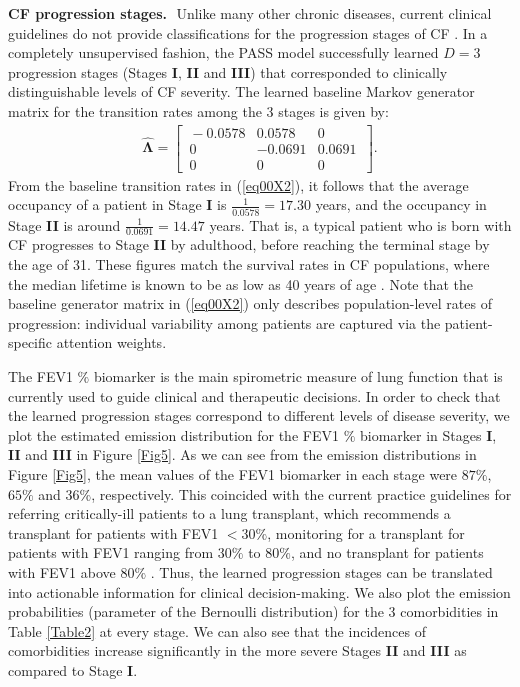 \documentclass[twoside,11pt]{article}
\begin{document}
{\bf CF progression stages.}\,\, Unlike many other chronic diseases, current clinical guidelines do not provide classifications for the progression stages of CF \cite{szczesniak2017phenotypes}. In a completely unsupervised fashion, the PASS model successfully learned \mbox{\footnotesize $D=3$} progression stages (Stages {\bf I}, {\bf II} and {\bf III}) that corresponded to clinically distinguishable levels of CF severity. The learned baseline Markov generator matrix for the transition rates among the 3 stages is given by:
\begin{align}
\boldsymbol{\hat{\Lambda}} = \begin{bmatrix}
\, -0.0578 & 0.0578 &  0  \, \\
\, 0  & -0.0691 & 0.0691 \, \\
\, 0 &  0 & 0 \,
  \end{bmatrix}. 
\label{eq00X2}
\end{align}  
From the baseline transition rates in (\ref{eq00X2}), it follows that the average occupancy of a patient in Stage {\bf I} is $\frac{1}{0.0578} = 17.30$ years, and the occupancy in Stage {\bf II} is around $\frac{1}{0.0691} = 14.47$ years. That is, a typical patient who is born with CF progresses to Stage {\bf II} by adulthood, before reaching the terminal stage by the age of 31. These figures match the survival rates in CF populations, where the median lifetime is known to be as low as 40 years of age \cite{mccarthy2013cf}. Note that the baseline generator matrix in (\ref{eq00X2}) only describes population-level rates of progression: individual variability among patients are captured via the patient-specific attention weights.  

The FEV1 $\%$ biomarker is the main spirometric measure of lung function that is currently used to guide clinical and therapeutic decisions. In order to check that the learned progression stages correspond to different levels of disease severity, we plot the estimated emission distribution for the FEV1 $\%$ biomarker in Stages {\bf I}, {\bf II} and {\bf III} in Figure \ref{Fig5}. As we can see from the emission distributions in Figure \ref{Fig5}, the mean values of the FEV1 biomarker in each stage were $87\%$, $65\%$ and $36\%$, respectively. This coincided with the current practice guidelines for referring critically-ill patients to a lung transplant, which recommends a transplant for patients with FEV1 $< 30\%$, monitoring for a transplant for patients with FEV1 ranging from $30\%$ to $80\%$, and no transplant for patients with FEV1 above $80\%$ \cite{braun2011cystic}. Thus, the learned progression stages can be translated into actionable information for clinical decision-making. We also plot the emission probabilities (parameter of the Bernoulli distribution) for the 3 comorbidities in Table \ref{Table2} at every stage. We can also see that the incidences of comorbidities increase significantly in the more severe Stages {\bf II} and {\bf III} as compared to Stage {\bf I}.
\end{document}

